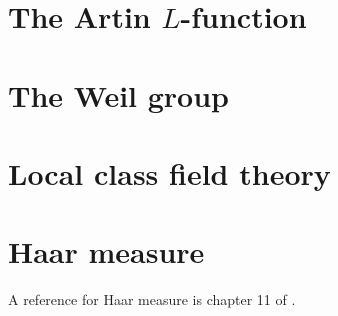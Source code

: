 \documentclass{amsart}
\begin{document}
\section{The Artin $L$-function}





\section{The Weil group}


\section{Local class field theory}

\section{Haar measure}

A reference for Haar measure is chapter 11 of \cite{Halmos-measure}.



\raggedright


\end{document}
